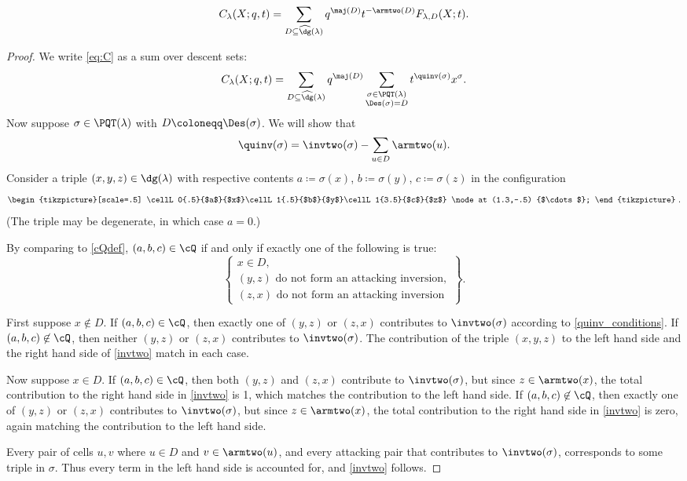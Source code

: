 \begin{lemma}
\[
C_{\lambda}(X; q,t) = \sum_{D\subseteq \widehat{\dg}(\lambda)} q^{\maj(D)} t^{-\armtwo(D)} F_{\lambda,D}(X;t).
\]
\end{lemma}
\begin{proof}
We write \eqref{eq:C} as a sum over descent sets:
\[
C_{\lambda}(X;q,t)=\sum_{D\subseteq \widehat{\dg}(\lambda)} q^{\maj(D)}\sum_{\substack{\sigma\in\PQT(\lambda)\\\Des(\sigma)=D}} t^{\quinv(\sigma)}x^{\sigma}.
\]
Now suppose $\sigma\in\PQT(\lambda)$ with $D\coloneqq\Des(\sigma)$. We will show that 
\begin{equation}\label{invtwo}
\quinv(\sigma)=\invtwo(\sigma)-\sum_{u\in D} \armtwo(u).
\end{equation}
Consider a triple $(x,y,z)\in\dg(\lambda)$ with respective contents $a\coloneqq\sigma(x)$, $b\coloneqq\sigma(y)$, $c\coloneqq\sigma(z)$ in the configuration  
\[
\begin{tikzpicture}[scale=.5]
\cellL0{.5}{$a$}{$x$}\cellL1{.5}{$b$}{$y$}\cellL1{3.5}{$c$}{$z$}
\node at (1.3,-.5) {$\cdots$};
\end{tikzpicture}
\ .
\] 
(The triple may be degenerate, in which case $a=0$.)

By comparing to \eqref{cQdef}, $(a,b,c)\in\cQ$ if and only if exactly one of the following is true:
\begin{equation}\label{quinv_conditions}
\left\{\begin{matrix}x \in D,\\(y,z) \text{ do not form an attacking inversion},\\ (z,x) \text{ do not form an attacking inversion}\end{matrix}\right\}.
\end{equation}

First suppose $x \not\in D$. If $(a,b,c)\in\cQ$, then exactly one of $(y,z)$ or $(z,x)$ contributes to $\invtwo(\sigma)$ according to \eqref{quinv_conditions}. If $(a,b,c)\not\in\cQ$, then neither $(y,z)$ or $(z,x)$ contributes to $\invtwo(\sigma)$. The contribution of the triple $(x,y,z)$ to the left hand side and the right hand side of \eqref{invtwo} match in each case. 

Now suppose $x\in D$.  If $(a,b,c)\in\cQ$, then both $(y,z)$ and $(z,x)$ contribute to $\invtwo(\sigma)$, but since $z\in\armtwo(x)$, the total contribution to the right hand side in \eqref{invtwo} is 1, which matches the contribution to the left hand side. If $(a,b,c)\not\in\cQ$, then exactly one of $(y,z)$ or $(z,x)$ contributes to $\invtwo(\sigma)$, but since $z\in\armtwo(x)$, the total contribution to the right hand side in \eqref{invtwo} is zero, again matching the contribution to the left hand side.

Every pair of cells $u,v$ where $u\in D$ and $v\in\armtwo(u)$, and every attacking pair that contributes to $\invtwo(\sigma)$, corresponds to some triple in $\sigma$. Thus every term in the left hand side is accounted for, and \eqref{invtwo} follows.
\end{proof}

